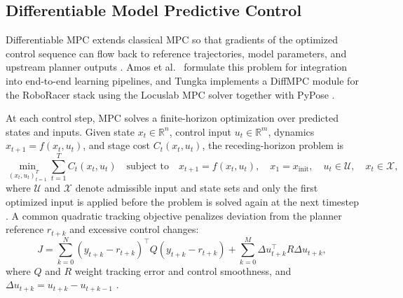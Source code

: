 \subsection{Differentiable Model Predictive Control}
\label{subsection:DiffMPC}

Differentiable MPC extends classical MPC so that gradients of the optimized control sequence can flow back to reference trajectories, model parameters, and upstream planner outputs \cite{amos_differentiable_2018, amos_OptNetDifferentiableOptimization_2017, blondel_EfficientModularImplicit_2022, pineda_TheseusLibraryDifferentiable_2022, swadiryus_DifferentiableMotionPlanning_2025, koch_DifferentiableInterpretablePath_2025}.
Amos et al.\ \cite{amos_differentiable_2018} formulate this problem for integration into end-to-end learning pipelines, and Tungka implements a DiffMPC module for the RoboRacer stack using the Locuslab MPC solver together with PyPose \cite{wang_pypose_2023, tungka_diffmpc_2024, liniger_OptimizationBasedAutonomousRacing_2017}.

At each control step, MPC solves a finite-horizon optimization over predicted states and inputs.
Given state $x_t \in \mathbb{R}^n$, control input $u_t \in \mathbb{R}^m$, dynamics $x_{t+1} = f(x_t, u_t)$, and stage cost $C_t(x_t, u_t)$, the receding-horizon problem is
\begin{equation}
    \min_{(x_t, u_t)_{t=1}^{T}} \sum_{t=1}^{T} C_t(x_t, u_t)
    \quad \text{subject to} \quad
    x_{t+1} = f(x_t, u_t), \quad x_1 = x_{\text{init}}, \quad u_t \in \mathcal{U}, \quad x_t \in \mathcal{X},
\end{equation}
where $\mathcal{U}$ and $\mathcal{X}$ denote admissible input and state sets and only the first optimized input is applied before the problem is solved again at the next timestep \cite{swadiryus_DifferentiableMotionPlanning_2025}.
A common quadratic tracking objective penalizes deviation from the planner reference $r_{t+k}$ and excessive control changes:
\begin{equation}
    J = \sum_{k=0}^{N} (y_{t+k} - r_{t+k})^{\top} Q (y_{t+k} - r_{t+k})
    + \sum_{k=0}^{M} \Delta u_{t+k}^{\top} R \Delta u_{t+k},
\end{equation}
where $Q$ and $R$ weight tracking error and control smoothness, and $\Delta u_{t+k} = u_{t+k} - u_{t+k-1}$ \cite{swadiryus_DifferentiableMotionPlanning_2025}.


